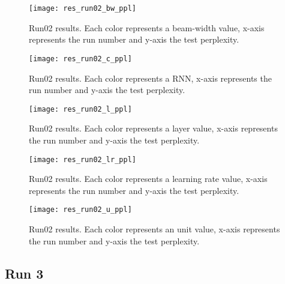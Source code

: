 \begin{landscape}
\begin{figure}
    \centering
    \texttt{[image: res\_run02\_bw\_ppl]}
    \decoRule
    \caption[Results run02 BW-PPL]{Run02 results. Each color represents a beam-width value, x-axis represents the run number and y-axis the test perplexity.}
    \label{fig:res_run02_bw_ppl}
\end{figure}
\begin{figure}
    \centering
    \texttt{[image: res\_run02\_c\_ppl]}
    \decoRule
    \caption[Results run02 C-PPL]{Run02 results. Each color represents a RNN, x-axis represents the run number and y-axis the test perplexity.}
    \label{fig:res_run02_c_ppl}
\end{figure}
\begin{figure}
    \centering
    \texttt{[image: res\_run02\_l\_ppl]}
    \decoRule
    \caption[Results run02 L-PPL]{Run02 results. Each color represents a layer value, x-axis represents the run number and y-axis the test perplexity.}
    \label{fig:res_run02_l_ppl}
\end{figure}
\begin{figure}
    \centering
    \texttt{[image: res\_run02\_lr\_ppl]}
    \decoRule
    \caption[Results run02 LR-PPL]{Run02 results. Each color represents a learning rate value, x-axis represents the run number and y-axis the test perplexity.}
    \label{fig:res_run02_lr_ppl}
\end{figure}
\begin{figure}
    \centering
    \texttt{[image: res\_run02\_u\_ppl]}
    \decoRule
    \caption[Results run02 U-PPL]{Run02 results. Each color represents an unit value, x-axis represents the run number and y-axis the test perplexity.}
    \label{fig:res_run02_u_ppl}
\end{figure}
\end{landscape}

\subsection{Run 3}

